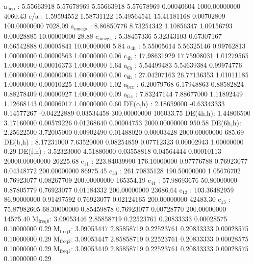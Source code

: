 \documentclass[11pt]{article}
\begin{document}
a\(_{\text{hcp}}\)   :   5.55663918   5.57678969   5.55663918   5.57678969   0.00040604 1000.00000000      4060.43
c/a     :   1.59594552   1.58731122  15.49564541  15.41181168   0.00702809 100.00000000      7028.09
a\(_{\text{omega}}\) :   8.86850776   8.73254342   1.10856347   1.09156793   0.00028885  10.00000000        28.88
c\(_{\text{omega}}\) :   5.38457336   5.32343103   0.67307167   0.66542888   0.00005841  10.00000000         5.84
a\(_{\text{4h}}\)    :   5.55005614   5.56325146   0.99762813   1.00000000   0.00000563   1.00000000         0.06
c\(_{\text{4h}}\)    :  17.98631929  17.75908031   1.01279565   1.00000000   0.00016373   1.00000000         1.64
a\(_{\text{6h}}\)    :   5.54499483   5.54639384   0.99974776   1.00000000   0.00000006   1.00000000         0.00
c\(_{\text{6h}}\)    :  27.04207163  26.77136353   1.01011185   1.00000000   0.00010225   1.00000000         1.02
a\(_{\text{bcc}}\)   :   6.20079768   6.17948863   0.88582824   0.88278409   0.00000927   1.00000000         0.09
a\(_{\text{fcc}}\)   :   7.83247144   7.88677000   1.11892449   1.12668143   0.00006017   1.00000000         0.60
DE(o,h) :   2.18659000  -0.63343333   0.14577267  -0.04222889   0.03534458 300.00000000    106033.75
DE(4h,h):   1.44806500   3.17160000   0.00579226   0.01268640   0.00004753 2000.00000000       950.58
DE(6h,h):   2.25622500   3.72005000   0.00902490   0.01488020   0.00003428 2000.00000000       685.69
DE(b,h) :   8.17231000   7.63520000   0.08254859   0.07712323   0.00002943   1.00000000         0.29
DE(f,h) :   3.52323000   4.51880000   0.03558818   0.04564444   0.00010113 20000.00000000     20225.68
c\(_{\text{11}}\)    : 223.84039990 176.10000000   0.97776788   0.76923077   0.04348772 200.00000000     86975.45
c\(_{\text{33}}\)    : 261.70835128 190.50000000   1.05676702   0.76923077   0.08267709 200.00000000    165354.19
c\(_{\text{44}}\)    :  57.98693676  50.80000000   0.87805779   0.76923077   0.01184332 200.00000000     23686.64
c\(_{\text{12}}\)    : 103.36482959  86.90000000   0.91497592   0.76923077   0.02124165 200.00000000     42483.30
c\(_{\text{13}}\)    :  75.87982605  68.30000000   0.85459878   0.76923077   0.00728770 200.00000000     14575.40
M\(_{\text{freq}}\)\(_{\text{0}}\):   3.09053446   2.85858719   0.22523761   0.20833333   0.00028575   0.10000000         0.29
M\(_{\text{freq}}\)\(_{\text{1}}\):   3.09053447   2.85858719   0.22523761   0.20833333   0.00028575   0.10000000         0.29
M\(_{\text{freq}}\)\(_{\text{2}}\):   3.09053447   2.85858719   0.22523761   0.20833333   0.00028575   0.10000000         0.29
M\(_{\text{freq}}\)\(_{\text{3}}\):   3.09053449   2.85858719   0.22523761   0.20833333   0.00028575   0.10000000         0.29
\end{document}
